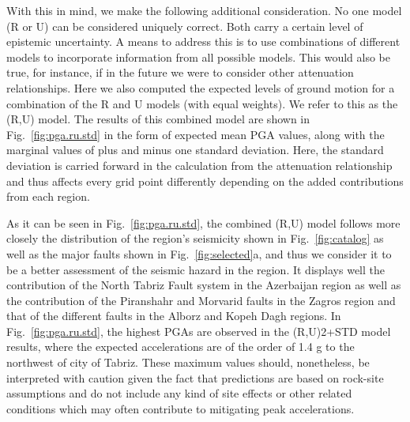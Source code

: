 With this in mind, we make the following additional consideration. No one model (R or U) can be considered uniquely correct. Both carry a certain level of epistemic uncertainty. A means to address this is to use combinations of different models to incorporate information from all possible models. This would also be true, for instance, if in the future we were to consider other attenuation relationships. Here we also computed the expected levels of ground motion for a combination of the R and U models (with equal weights). We refer to this as the (R,U) model. The results of this combined model are shown in Fig.~\ref{fig:pga.ru.std} in the form of expected mean PGA values, along with the marginal values of plus and minus one standard deviation. Here, the standard deviation is carried forward in the calculation from the attenuation relationship and thus affects every grid point differently depending on the added contributions from each region. 

As it can be seen in Fig.~\ref{fig:pga.ru.std}, the combined (R,U) model follows more closely the distribution of the region's seismicity shown in Fig.~\ref{fig:catalog} as well as the major faults shown in Fig.~\ref{fig:selected}a, and thus we consider it to be a better assessment of the seismic hazard in the region. It displays well the contribution of the North Tabriz Fault system in the Azerbaijan region as well as the contribution of the Piranshahr and Morvarid faults in the Zagros region and that of the different faults in the Alborz and Kopeh Dagh regions. In Fig.~\ref{fig:pga.ru.std}, the highest PGAs are observed in the (R,U)2+STD model results, where the expected accelerations are of the order of 1.4 g to the northwest of city of Tabriz. These maximum values should, nonetheless, be interpreted with caution given the fact that predictions are based on rock-site assumptions and do not include any kind of site effects or other related conditions which may often contribute to mitigating peak accelerations.

